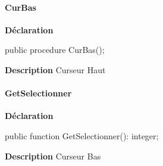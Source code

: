 \documentclass{report}
\newif\ifpdf
\begin{document}
\paragraph*{CurBas}\hspace*{\fill}

\label{LesMenus.TMainMenu-CurBas}
\begin{list}{}{
\setlength{\itemindent}{0cm}
\setlength{\listparindent}{0cm}
\setlength{\leftmargin}{\evensidemargin}
\addtolength{\leftmargin}{\tmplength}
\settowidth{\labelsep}{X}
\addtolength{\leftmargin}{\labelsep}
\setlength{\labelwidth}{\tmplength}
}
\item[\textbf{Déclaration}\hfill]
\ifpdf
\begin{flushleft}
\fi
\begin{ttfamily}
public procedure CurBas();\end{ttfamily}

\ifpdf
\end{flushleft}
\fi

\par
\item[\textbf{Description}]
Curseur Haut

\end{list}
\paragraph*{GetSelectionner}\hspace*{\fill}

\label{LesMenus.TMainMenu-GetSelectionner}
\begin{list}{}{
\setlength{\itemindent}{0cm}
\setlength{\listparindent}{0cm}
\setlength{\leftmargin}{\evensidemargin}
\addtolength{\leftmargin}{\tmplength}
\settowidth{\labelsep}{X}
\addtolength{\leftmargin}{\labelsep}
\setlength{\labelwidth}{\tmplength}
}
\item[\textbf{Déclaration}\hfill]
\ifpdf
\begin{flushleft}
\fi
\begin{ttfamily}
public function GetSelectionner(): integer;\end{ttfamily}

\ifpdf
\end{flushleft}
\fi

\par
\item[\textbf{Description}]
Curseur Bas

\end{list}
\end{document}
